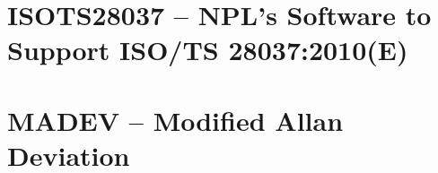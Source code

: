\documentclass[12pt,a4paper,oneside]{report} %
\begin{document}
\section*{\infosection} %

\section*{\examplesection} %

\resumecontents[maintoc]

\chapter{ISOTS28037 -- NPL’s Software to Support ISO/TS 28037:2010(E)} %
\stopcontents[maintoc]
\section*{\infosection} %

\section*{\examplesection} %

\resumecontents[maintoc]

\chapter{MADEV -- Modified Allan Deviation} %
\stopcontents[maintoc]
\section*{\infosection} %

\section*{\examplesection} %

\resumecontents[maintoc]
\end{document}
